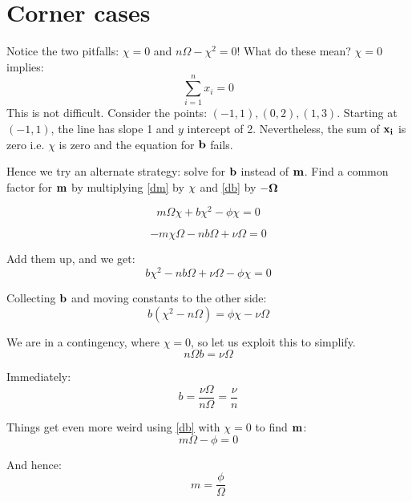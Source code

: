 \documentclass{article}
\begin{document}
\section{Corner cases}

Notice the two pitfalls:  $\chi = 0$ and $n \Omega - \chi^2 = 0$!   What
do these mean?   $\chi = 0$ implies:
\begin{equation}
\sum_{i=1}^n x_i = 0
\end{equation}
This is not difficult.  Consider the points: $(-1, 1), (0, 2), (1, 3)$.
Starting at $(-1, 1)$, the line has slope 1 and $y$ intercept of 2.
Nevertheless, the sum of ${\bf x_i}$ is zero i.e. ${\chi}$ is zero and the
equation for ${\bf b}$ fails.

Hence we try an alternate strategy: solve for ${\bf b}$ instead of ${\bf m}$.
Find a common factor for ${\bf m}$ by multiplying \eqref{dm} by ${\bf \chi}$
 and \eqref{db} by ${\bf -\Omega}$

\begin{equation}
 m \Omega \chi + b \chi^2 - \phi \chi = 0
\end{equation}

\begin{equation}
- m \chi \Omega - n b \Omega + \nu \Omega = 0
\end{equation}

Add them up, and we get:
\begin{equation}
 b \chi^2 - n b \Omega + \nu \Omega - \phi \chi  = 0
\end{equation}

Collecting ${\bf b}$ and moving constants to the other side:
\begin{equation}
b (\chi^2 - n \Omega) =  \phi \chi - \nu \Omega
\end{equation}

We are in a contingency, where $\chi = 0$, so let us exploit this to simplify.
\begin{equation}
n \Omega b =  \nu \Omega
\end{equation}

Immediately:
\begin{equation}
b = \frac{\nu \Omega}{n \Omega} = \frac{\nu}{n}
\end{equation}

Things get even more weird using \eqref{db} with $\chi = 0$ to find ${\bf m}$:
\begin{equation}
m \Omega - \phi = 0
\end{equation}

And hence:
\begin{equation}
m = \frac{\phi}{\Omega}
\end{equation}
\end{document}

